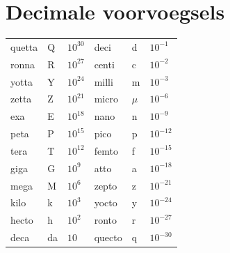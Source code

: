 \documentclass[twoside]{report}
\begin{document}
\section*{\center Decimale voorvoegsels}
\begin{center}
\begin{tabular}{||lll|lll||}
\hline
quetta&Q&$10^{30}$&deci  &d &$10^{-1}$\rule{0pt}{11pt}\\
ronna &R&$10^{27}$&centi &c &$10^{-2}$\\
yotta &Y&$10^{24}$&milli &m &$10^{-3}$\\
zetta &Z&$10^{21}$&micro &$\mu$&$10^{-6}$\\
exa   &E&$10^{18}$&nano  &n&$10^{-9}$\\
peta  &P&$10^{15}$&pico  &p&$10^{-12}$\\
tera  &T&$10^{12}$&femto &f&$10^{-15}$\\
giga  &G&$10^9$   &atto  &a&$10^{-18}$\\
mega  &M&$10^6$   &zepto &z&$10^{-21}$\\
kilo  &k&$10^3$   &yocto &y&$10^{-24}$\\
hecto &h&$10^2$   &ronto &r&$10^{-27}$\\
deca  &da&$10 $   &quecto&q&$10^{-30}$\\
\hline
\end{tabular}
\end{center}
\end{document}
